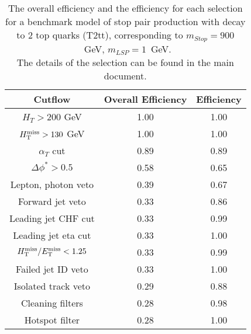 \begin{longtable}{| c | c | c  | }
\caption{The overall efficiency and the efficiency for each selection for a benchmark model 
  of stop pair production with decay to 2 top quarks
  (T2tt), corresponding to $m_{Stop} = 900 $~GeV, $m_{LSP} = 1$~GeV. \\
  The details of the selection can be found in the main document. \label{tab:T2tt_900_1}} \\    \hline 
\textbf{Cutflow} & \textbf{Overall Efficiency} & \textbf{Efficiency}\\ \hline 
$H_{T} > 200$ GeV & 1.00 & 1.00\\ \hline 
$H_{\rm T}^{\rm miss} > 130$ GeV & 1.00 & 1.00\\ \hline 
$\alpha_{T}$ cut & 0.89 & 0.89\\ \hline 
$\Delta\phi^{*} > 0.5$ & 0.58 & 0.65\\ \hline 
Lepton, photon veto & 0.39 & 0.67\\ \hline 
Forward jet veto & 0.33 & 0.86\\ \hline 
Leading jet CHF cut & 0.33 & 0.99\\ \hline 
Leading jet eta cut & 0.33 & 1.00\\ \hline 
$H_{\rm T}^{\rm miss} / E_{\rm T}^{\rm miss} < 1.25$ & 0.33 & 0.99\\ \hline 
Failed jet ID veto & 0.33 & 1.00\\ \hline 
Isolated track veto & 0.29 & 0.88\\ \hline 
Cleaning filters & 0.28 & 0.98\\ \hline 
Hotspot filter & 0.28 & 1.00\\ \hline 
    \hline 
    \hline 
\end{longtable}
